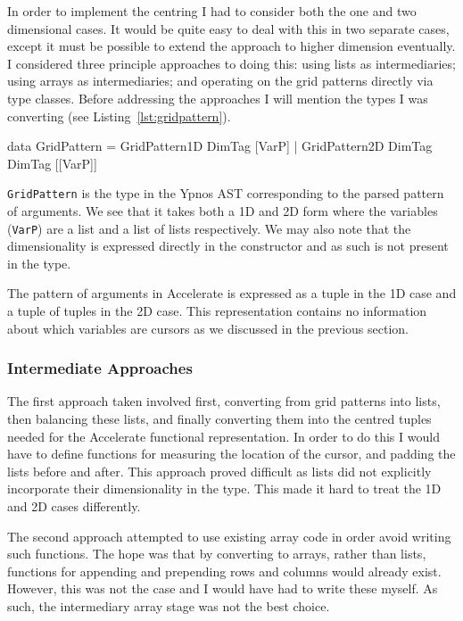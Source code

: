 \documentclass[12pt,a4paper,oneside]{scrbook}
\begin{document}
In order to implement the centring I had to consider both the one and two
dimensional cases. It would be quite easy to deal with this in two separate
cases, except it must be possible to extend the approach to higher dimension
eventually. I considered three principle approaches to doing this: using lists
as intermediaries; using arrays as intermediaries; and operating on the grid
patterns directly via type classes. Before addressing the approaches I will
mention the types I was converting (see Listing~\ref{lst:gridpattern}).

\begin{hflisting}[label={lst:gridpattern}, caption=The data type which stores
  the grid patterns in Ypnos. Notice that the dimensionality is not exposed in
  the type.]
data GridPattern =
    GridPattern1D DimTag [VarP] |
    GridPattern2D DimTag DimTag [[VarP]]
\end{hflisting}

\texttt{GridPattern} is the type in the Ypnos AST corresponding to the
parsed pattern of arguments. We see that it takes both a 1D and 2D form
where the variables (\texttt{VarP}) are a list and a list of lists
respectively. We may also note that the dimensionality is expressed
directly in the constructor and as such is not present in the type.

The pattern of arguments in Accelerate is expressed as a tuple in the 1D case
and a tuple of tuples in the 2D case. This representation contains no
information about which variables are cursors as we discussed in the previous
section.

\subsubsection{Intermediate Approaches}

The first approach taken involved first, converting from grid patterns into
lists, then balancing these lists, and finally converting them into the centred
tuples needed for the Accelerate functional representation. In order to do this
I would have to define functions for measuring the location of the cursor, and
padding the lists before and after. This approach proved difficult as lists did
not explicitly incorporate their dimensionality in the type. This made it hard
to treat the 1D and 2D cases differently.

The second approach attempted to use existing array code in order avoid writing
such functions. The hope was that by converting to arrays, rather than lists,
functions for appending and prepending rows and columns would already
exist. However, this was not the case and I would have had to write these
myself. As such, the intermediary array stage was not the best choice.
\end{document}
